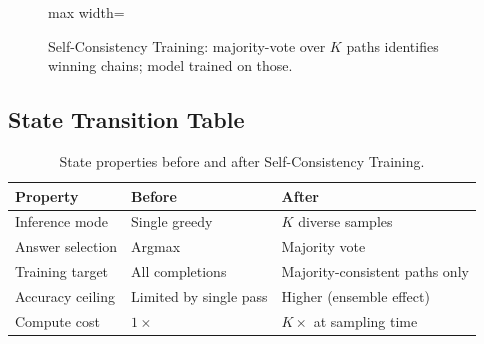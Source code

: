 \documentclass{article}
\begin{document}
\begin{figure}[h]
\centering
\begin{adjustbox}{max width=\linewidth}
\end{adjustbox}
\caption{Self-Consistency Training: majority-vote over $K$ paths identifies winning chains; model trained on those.}
\end{figure}

\subsection{State Transition Table}
\begin{table}[h]\centering
\begin{tabular}{lll}\toprule
\textbf{Property} & \textbf{Before} & \textbf{After}\\\midrule
Inference mode & Single greedy & $K$ diverse samples\\
Answer selection & Argmax & Majority vote\\
Training target & All completions & Majority-consistent paths only\\
Accuracy ceiling & Limited by single pass & Higher (ensemble effect)\\
Compute cost & $1\times$ & $K\times$ at sampling time\\\bottomrule
\end{tabular}
\caption{State properties before and after Self-Consistency Training.}
\end{table}
\end{document}
